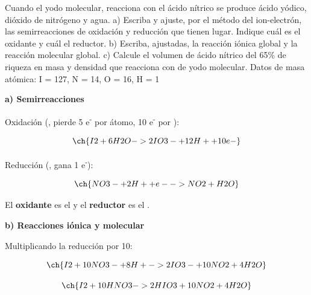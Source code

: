 \begin{exerciseEVAU}
    Cuando el yodo molecular, reacciona con el ácido nítrico se produce ácido yódico, dióxido de nitrógeno y agua.
    a) Escriba y ajuste, por el método del ion-electrón, las semirreacciones de oxidación y reducción que tienen lugar.
    Indique cuál es el oxidante y cuál el reductor.
    b) Escriba, ajustadas, la reacción iónica global y la reacción molecular global. c) Calcule el volumen de ácido nítrico del 65\% de riqueza en masa y densidad  que reacciona con   de yodo molecular.
    Datos de masa atómica: I = 127, N = 14, O = 16, H = 1

    \begin{solu}


        \textbf{a) Semirreacciones}

        Oxidación (, pierde 5 e\textsuperscript{-} por átomo, 10 e\textsuperscript{-} por ):

        \begin{equation*}
            \ch{I2 + 6 H2O -> 2 IO3- + 12 H+ + 10 e-}
        \end{equation*}

        Reducción (, gana 1 e\textsuperscript{-}):

        \begin{equation*}
            \ch{NO3- + 2 H+ + e- -> NO2 + H2O}
        \end{equation*}

        El \textbf{oxidante} es el  y el \textbf{reductor} es el .

        \textbf{b) Reacciones iónica y molecular}

        Multiplicando la reducción por 10:

        \begin{equation*}
            \ch{I2 + 10 NO3- + 8 H+ -> 2 IO3- + 10 NO2 + 4 H2O}
        \end{equation*}

        \begin{equation*}
            \ch{I2 + 10 HNO3 -> 2 HIO3 + 10 NO2 + 4 H2O}
        \end{equation*}


\end{solu}
\end{exerciseEVAU}
